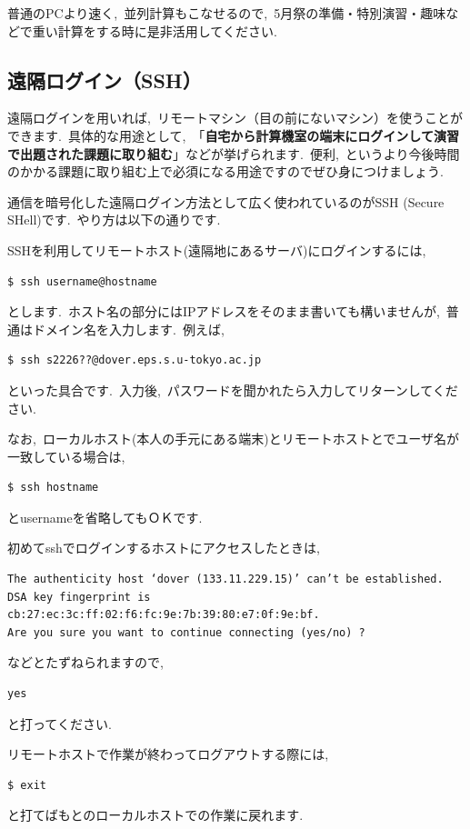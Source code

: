 \documentclass{jarticle}
\begin{document}
普通のPCより速く,\ 並列計算もこなせるので,\ 5月祭の準備・特別演習・趣味などで重い計算をする時に是非活用してください.\ 


\subsection{遠隔ログイン（SSH）}
遠隔ログインを用いれば,\ リモートマシン（目の前にないマシン）を使うことができます.\ 具体的な用途として,\ 「{\bf 自宅から計算機室の端末にログインして演習で出題された課題に取り組む}」などが挙げられます.\ 便利,\ というより今後時間のかかる課題に取り組む上で必須になる用途ですのでぜひ身につけましょう.\ 
 
通信を暗号化した遠隔ログイン方法として広く使われているのがSSH  (Secure SHell)です.\ やり方は以下の通りです.\ 

SSHを利用してリモートホスト(遠隔地にあるサーバ)にログインするには,\ 
\begin{verbatim}
$ ssh username@hostname
\end{verbatim}
とします.\ ホスト名の部分にはIPアドレスをそのまま書いても構いませんが,\ 普通はドメイン名を入力します.\ 例えば,\ 
\begin{verbatim}
$ ssh s2226??@dover.eps.s.u-tokyo.ac.jp
\end{verbatim}
といった具合です.\ 入力後,\ パスワードを聞かれたら入力してリターンしてください.\ 

なお,\ ローカルホスト(本人の手元にある端末)とリモートホストとでユーザ名が一致している場合は,\ 
\begin{verbatim}
$ ssh hostname
\end{verbatim}
とusernameを省略してもＯＫです.\ 

初めてsshでログインするホストにアクセスしたときは,\ 
\begin{Verbatim}[baselinestretch=0.5]
The authenticity host ‘dover (133.11.229.15)’ can’t be established.
DSA key fingerprint is cb:27:ec:3c:ff:02:f6:fc:9e:7b:39:80:e7:0f:9e:bf.
Are you sure you want to continue connecting (yes/no) ?
\end{Verbatim}
などとたずねられますので,\ 
\begin{verbatim}
yes 
\end{verbatim}
と打ってください.\ 

リモートホストで作業が終わってログアウトする際には,\ 
\begin{verbatim}
$ exit
\end{verbatim}
と打てばもとのローカルホストでの作業に戻れます.\ 
\end{document}
